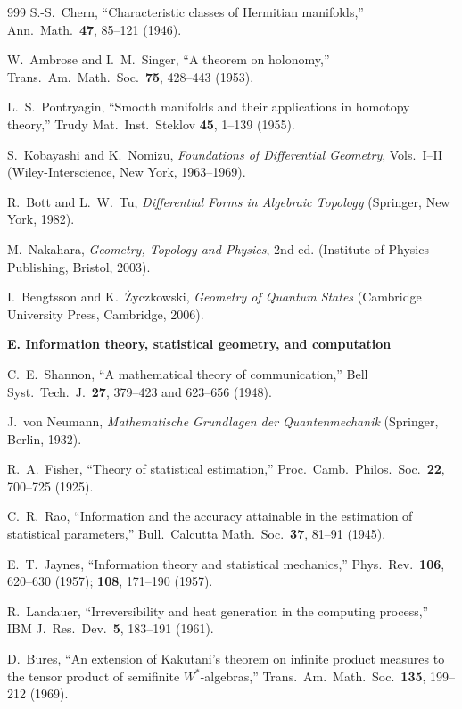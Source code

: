 \begin{thebibliography}{999}
S.-S.~Chern,
``Characteristic classes of Hermitian manifolds,''
Ann.\ Math.\ \textbf{47}, 85--121 (1946).

W.~Ambrose and I.~M.~Singer,
``A theorem on holonomy,''
Trans.\ Am.\ Math.\ Soc.\ \textbf{75}, 428--443 (1953).

L.~S.~Pontryagin,
``Smooth manifolds and their applications in homotopy theory,''
Trudy Mat.\ Inst.\ Steklov \textbf{45}, 1--139 (1955).

S.~Kobayashi and K.~Nomizu,
\emph{Foundations of Differential Geometry}, Vols.~I--II
(Wiley-Interscience, New York, 1963--1969).

R.~Bott and L.~W.~Tu,
\emph{Differential Forms in Algebraic Topology}
(Springer, New York, 1982).

M.~Nakahara,
\emph{Geometry, Topology and Physics}, 2nd ed.
(Institute of Physics Publishing, Bristol, 2003).

I.~Bengtsson and K.~\.{Z}yczkowski,
\emph{Geometry of Quantum States}
(Cambridge University Press, Cambridge, 2006).

\item[]\textbf{E. Information theory, statistical geometry, and computation}

C.~E.~Shannon,
``A mathematical theory of communication,''
Bell Syst.\ Tech.\ J.\ \textbf{27}, 379--423 and 623--656 (1948).

J.~von Neumann,
\emph{Mathematische Grundlagen der Quantenmechanik}
(Springer, Berlin, 1932).

R.~A.~Fisher,
``Theory of statistical estimation,''
Proc.\ Camb.\ Philos.\ Soc.\ \textbf{22}, 700--725 (1925).

C.~R.~Rao,
``Information and the accuracy attainable in the estimation of statistical
parameters,'' Bull.\ Calcutta Math.\ Soc.\ \textbf{37}, 81--91 (1945).

E.~T.~Jaynes,
``Information theory and statistical mechanics,''
Phys.\ Rev.\ \textbf{106}, 620--630 (1957); \textbf{108}, 171--190 (1957).

R.~Landauer,
``Irreversibility and heat generation in the computing process,''
IBM J.\ Res.\ Dev.\ \textbf{5}, 183--191 (1961).

D.~Bures,
``An extension of Kakutani's theorem on infinite product measures to the
tensor product of semifinite $W^*$-algebras,''
Trans.\ Am.\ Math.\ Soc.\ \textbf{135}, 199--212 (1969).


\end{thebibliography}
